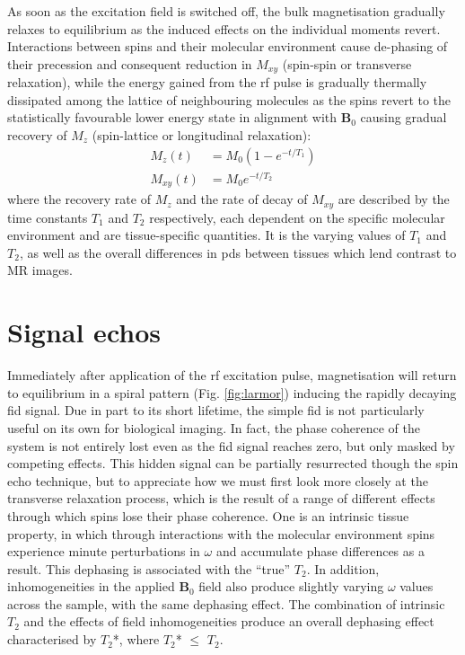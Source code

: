 \documentclass[12pt,phd,a4paper,twoside]{ucl_thesis}
\begin{document}
As soon as the excitation field is switched off, the bulk magnetisation gradually relaxes to equilibrium as the induced effects on the individual moments revert.
Interactions between spins and their molecular environment cause de-phasing of their precession and consequent reduction in $M_{xy}$ (spin-spin or transverse relaxation), while the energy gained from the \gls{rf} pulse is gradually thermally dissipated among the lattice of neighbouring molecules as the spins revert to the statistically favourable lower energy state in alignment with $\mathbf{B}_0$ causing gradual recovery of $M_z$ (spin-lattice or longitudinal relaxation):
\begin{align}
  M_z(t)  &= M_0 (1-e^{-t/T_1}) \\
  M_{xy}(t) &= M_0 e^{-t/T_2} \label{eq:recovery}
\end{align}
where the recovery rate of $M_z$ and the rate of decay of $M_{xy}$ are described by the time constants $T_1$ and $T_2$ respectively, each dependent on the specific molecular environment and are tissue-specific quantities.
It is the varying values of $T_1$ and $T_2$, as well as the overall differences in \glspl{pd} between tissues which lend contrast to MR images.

\section{Signal echos}\label{sec:echos}

Immediately after application of the \gls{rf} excitation pulse, magnetisation will return to equilibrium in a spiral pattern (Fig. \ref{fig:larmor}) inducing the rapidly decaying \gls{fid} signal.
Due in part to its short lifetime, the simple \gls{fid} is not particularly useful on its own for biological imaging.
In fact, the phase coherence of the system is not entirely lost even as the \gls{fid} signal reaches zero, but only masked by competing effects.
This hidden signal can be partially resurrected though the spin echo technique, but to appreciate how we must first look more closely at the transverse relaxation process, which is the result of a range of different effects through which spins lose their phase coherence.
One is an intrinsic tissue property, in which through interactions with the molecular environment spins experience minute perturbations in $\omega$ and accumulate phase differences as a result.
This dephasing is associated with the ``true'' $T_2$.
In addition, inhomogeneities in the applied $\mathbf{B}_0$ field also produce slightly varying $\omega$ values across the sample, with the same dephasing effect.
The combination of intrinsic $T_2$ and the effects of field inhomogeneities produce an overall dephasing effect characterised by $T_2$*, where  $T_2$* $\leqslant$ $T_2$.
\end{document}
